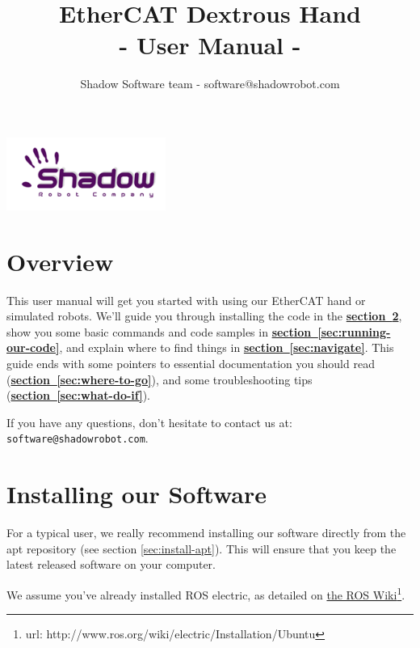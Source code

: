 \documentclass[12pt]{article}
\title{\textbf{EtherCAT Dextrous Hand} \\
- User Manual -}
\author{Shadow Software team - software@shadowrobot.com}
\newcommand{\link}[1]{\hyperref[sec:#1]{\textbf{section~\ref*{sec:#1}}}}
\newcommand{\betterhref}[2]{\href{#1}{#2}\footnote{url: #1}}
\begin{document}
\begin{titlepage}

\maketitle
\vspace{5cm}
\begin{center}
\includegraphics{images/logo-shadowDB.png}
\end{center}
\end{titlepage}

\tableofcontents
\newpage

\section{Overview}
\label{sec:overview}

\par This user manual will get you started with using our EtherCAT hand or simulated robots. We'll guide you through installing the code in the \link{install}, show you some basic commands and code samples in \link{running-our-code}, and explain where to find things in \link{navigate}. This guide ends with some pointers to essential documentation you should read (\link{where-to-go}), and some troubleshooting tips (\link{what-do-if}). \\

\par If you have any questions, don't hesitate to contact us at: \texttt{software@shadowrobot.com}.\\

\newpage

\section{Installing our Software}
\label{sec:install}
\par For a typical user, we really recommend installing our software directly from the apt repository (see section \ref{sec:install-apt}). This will ensure that you keep the latest released software on your computer.\\

\par We assume you've already installed ROS electric, as detailed on \betterhref{http://www.ros.org/wiki/electric/Installation/Ubuntu}{the ROS Wiki}.\\
\end{document}
